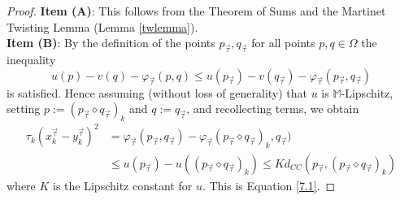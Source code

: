 \documentclass[reqno]{amsart}
\begin{document}
\begin{proof}
\textbf{Item (A)}: This follows from the Theorem of Sums \cite[Theorem 3.2]{CIL:UGTVS} and the Martinet Twisting Lemma (Lemma \ref{twlemma}).\\
\textbf{Item (B)}:
By the definition of the points $p_{\vec{\tau}}, q_{\vec{\tau}}$ for all points $p,q\in\Omega$ the inequality
\[u(p)-v(q)-\varphi_{\vec{\tau}}(p,q)\leq u(p_{\vec{\tau}})-v(q_{\vec{\tau}})-\varphi_{\vec{\tau}}(p_{\vec{\tau}},q_{\vec{\tau}})\]
is satisfied. Hence assuming (without loss of generality) that $u$ is $\mathbb{M}$-Lipschitz,  setting $p:=(p_{\vec{\tau}}\diamond q_{\vec{\tau}})_k$ and $q:=q_{\vec{\tau}}$, and recollecting terms, we obtain
\begin{align}
\nonumber\tau_k(x_k^{\vec{\tau}}-y_k^{\vec{\tau}})^2&=\varphi_{\vec{\tau}}(p_{\vec{\tau}},q_{\vec{\tau}})-\varphi_{\vec{\tau}}(p_{\vec{\tau}}\diamond q_{\vec{\tau}})_k,q_{\vec{\tau}})\\
&\leq u(p_{\vec{\tau}})-u((p_{\vec{\tau}}\diamond q_{\vec{\tau}})_k) \leq Kd_{CC}(p_{\vec{\tau}},(p_{\vec{\tau}}\diamond q_{\vec{\tau}})_k) \label{7.5}
\end{align}
where $K$ is the Lipschitz constant for $u$. This is Equation \eqref{7.1}.


\end{proof}
\end{document}
